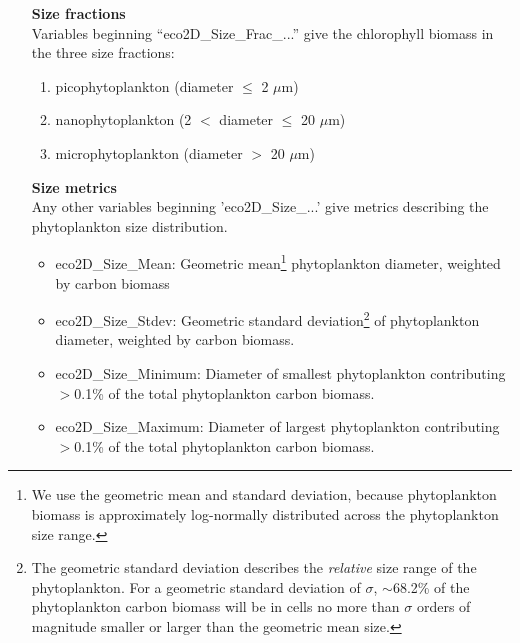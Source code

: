 \documentclass[11pt,fleqn]{book} %
\begin{document}
\vspace{2mm}
\begin{itemize}[noitemsep]

\item[\textbf{Size fractions}] \
\\Variables beginning ``\textsf{\footnotesize eco2D\_Size\_Frac\_...}'' give the chlorophyll biomass in the three size fractions:
\vspace{1mm}
\begin{enumerate}[noitemsep]
\item picophytoplankton (diameter $\le$ 2 $\mu$m)
\item nanophytoplankton (2 $<$ diameter $\le$ 20 $\mu$m)
\item microphytoplankton (diameter $>$ 20 $\mu$m)
\end{enumerate}
\vspace{1mm}

\item[\textbf{Size metrics}] \
\\Any other variables beginning '\textsf{\footnotesize eco2D\_Size\_...}' give metrics describing the {phytoplankton} size distribution.
\vspace{1mm}
\begin{itemize}[noitemsep]
\item \textsf{\footnotesize eco2D\_Size\_Mean}: Geometric mean\footnote{ We use the geometric mean and standard deviation, because phytoplankton biomass is approximately log-normally distributed across the phytoplankton size range.} phytoplankton diameter, weighted by carbon biomass
\item \textsf{\footnotesize eco2D\_Size\_Stdev}: Geometric standard deviation\footnote{ The geometric standard deviation describes the \textit{relative} size range of the phytoplankton. For a geometric standard deviation of $\sigma$, $\sim$68.2\% of the phytoplankton carbon biomass will be in cells no more than $\sigma$ orders of magnitude smaller or larger than the geometric mean size.} of phytoplankton diameter, weighted by carbon biomass.
\item \textsf{\footnotesize eco2D\_Size\_Minimum}: Diameter of smallest phytoplankton contributing $>$0.1\% of the total phytoplankton carbon biomass.
\item \textsf{\footnotesize eco2D\_Size\_Maximum}: Diameter of largest phytoplankton contributing $>$0.1\% of the total phytoplankton carbon biomass.
\end{itemize}
\vspace{1mm}


\end{itemize}
\end{document}
